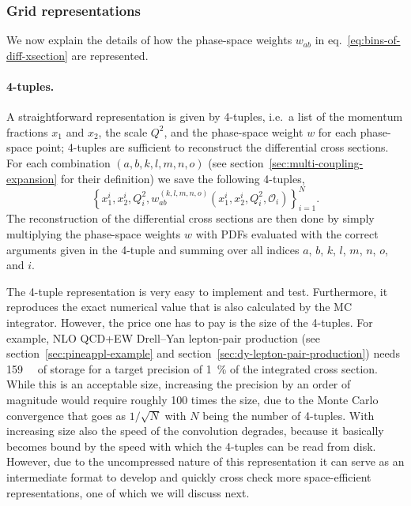 \subsubsection{Grid representations}
\label{sec:grid-representation}

We now explain the details of how the phase-space weights $w_{ab}$ in eq.~\eqref{eq:bins-of-diff-xsection} are represented.

\paragraph{4-tuples.}
A straightforward representation is given by 4-tuples, i.e.\ a list of the momentum fractions $x_1$ and $x_2$, the scale $Q^2$, and the phase-space weight $w$ for each phase-space point; 4-tuples are sufficient to reconstruct the differential cross sections.
For each combination $(a,b,k,l,m,n,o)$ (see section~\ref{sec:multi-coupling-expansion} for their definition) we save the following 4-tuples,
\begin{equation}
\left\{ x_1^i, x_2^i, Q^2_i, w^{(k,l,m,n,o)}_{ab} (x_1^i, x_2^i, Q^2_i, \mathcal{O}_i) \right\}_{i=1}^N \text{.} \label{eq:four-tuples}
\end{equation}
The reconstruction of the differential cross sections are then done by simply multiplying the phase-space weights $w$ with PDFs evaluated with the correct arguments given in the 4-tuple and summing over all indices $a$, $b$, $k$, $l$, $m$, $n$, $o$, and $i$.

The 4-tuple representation is very easy to implement and test.
Furthermore, it reproduces the exact numerical value that is also calculated by the MC integrator.
However, the price one has to pay is the size of the 4-tuples.
For example, NLO QCD+EW Drell--Yan lepton-pair production (see section~\ref{sec:pineappl-example} and section~\ref{sec:dy-lepton-pair-production}) needs \SI{159}{\mega\byte} of storage for a target precision of \SI{1}{\percent} of the integrated cross section.
While this is an acceptable size, increasing the precision by an order of magnitude would require roughly 100 times the size, due to the Monte Carlo convergence that goes as $1/\sqrt{N}$ with $N$ being the number of 4-tuples.
With increasing size also the speed of the convolution degrades, because it basically becomes bound by the speed with which the 4-tuples can be read from disk.
However, due to the uncompressed nature of this representation it can serve as an intermediate format to develop and quickly cross check more space-efficient representations, one of which we will discuss next.

